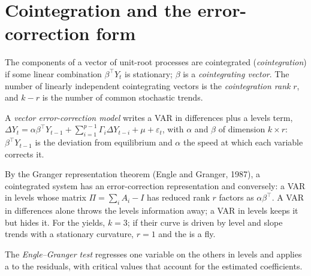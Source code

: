 \section{Cointegration and the error-correction form}

\begin{definition}\label{def:qm:multivariate-series-and-cointegration:coint}
The components of a vector of unit-root processes are cointegrated (\emph{cointegration}) if some linear combination $\beta^\top Y_t$ is
stationary; $\beta$ is a \emph{cointegrating vector}. The number of linearly independent cointegrating vectors is the
\emph{cointegration rank} $r$, and $k - r$ is the number of common stochastic trends.
\end{definition}

\begin{definition}\label{def:qm:multivariate-series-and-cointegration:vecm}
A \emph{vector error-correction model} writes a VAR in differences plus a levels term, $\Delta Y_t = \alpha\beta^\top Y_{t-1} +
\sum_{i=1}^{p-1}\Gamma_i\Delta Y_{t-i} + \mu + \varepsilon_t$, with $\alpha$ and $\beta$ of dimension $k \times r$: $\beta^\top Y_{t-1}$ is the deviation from equilibrium
and $\alpha$ the speed at which each variable corrects it.
\end{definition}

By the Granger representation theorem (Engle and Granger, 1987), a cointegrated system has an error-correction representation and conversely: a VAR in levels
whose matrix $\Pi = \sum_iA_i - I$ has reduced rank $r$ factors as $\alpha\beta^\top$. A VAR in differences alone throws the levels information away; a VAR in
levels keeps it but hides it. For the yields, $k = 3$; if their curve is driven by level and slope trends with a stationary curvature, $r = 1$ and the
 is a fly.

\begin{definition}\label{def:qm:multivariate-series-and-cointegration:eg}
The \emph{Engle--Granger test} regresses one variable on the others in levels and applies a  to the residuals,
with critical values that account for the estimated coefficients.
\end{definition}


